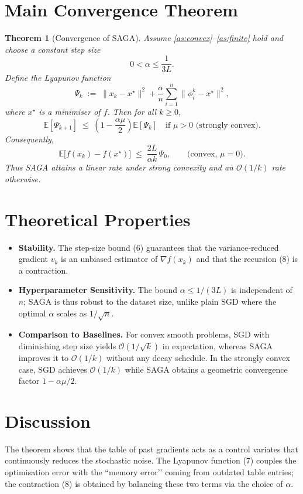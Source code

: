 \documentclass{article}
\newtheorem{theorem}{Theorem}
\begin{document}
\section*{Main Convergence Theorem}
\begin{theorem}[Convergence of SAGA]\label{thm:conv}
Assume \ref{as:convex}–\ref{as:finite} hold and choose a constant step size
\[
0<\alpha\le\frac{1}{3L}.
\tag{6}
\]
Define the Lyapunov function
\[
\Psi_k\;:=\;\|x_k-x^\star\|^2
          +\frac{\alpha}{n}\sum_{i=1}^{n}\|\phi_i^{k}-x^\star\|^2,
\tag{7}
\]
where $x^\star$ is a minimiser of $f$. Then for all $k\ge0$,
\[
\mathbb{E}[\Psi_{k+1}]\;\le\;
\left(1-\frac{\alpha\mu}{2}\right)\mathbb{E}[\Psi_k]
\quad\text{if $\mu>0$ (strongly convex).}
\tag{8}
\]
Consequently,
\[
\mathbb{E}\bigl[f(x_k)-f(x^\star)\bigr]\;\le\;
\frac{2L}{\alpha k}\,\Psi_0,
\qquad\text{(convex, $\mu=0$)}.
\tag{9}
\]
Thus SAGA attains a linear rate under strong convexity and an
$\mathcal{O}(1/k)$ rate otherwise.
\end{theorem}

\section*{Theoretical Properties}
\begin{itemize}
\item \textbf{Stability.} The step‑size bound (6) guarantees that the
variance‑reduced gradient $v_k$ is an unbiased estimator of $\nabla f(x_k)$
and that the recursion (8) is a contraction.
\item \textbf{Hyperparameter Sensitivity.}
The bound $\alpha\le 1/(3L)$ is independent of $n$; SAGA is thus
robust to the dataset size, unlike plain SGD where the optimal $\alpha$
scales as $1/\sqrt{n}$.
\item \textbf{Comparison to Baselines.}
For convex smooth problems, SGD with diminishing step size yields
$\mathcal{O}(1/\sqrt{k})$ in expectation, whereas SAGA improves it to
$\mathcal{O}(1/k)$ without any decay schedule. In the strongly convex
case, SGD achieves $\mathcal{O}(1/k)$ while SAGA obtains a geometric
convergence factor $1-\alpha\mu/2$.
\end{itemize}

\section*{Discussion}
The theorem shows that the table of past gradients acts as a control
variates that continuously reduces the stochastic noise. The Lyapunov
function (7) couples the optimisation error with the “memory error’’
coming from outdated table entries; the contraction (8) is obtained by
balancing these two terms via the choice of $\alpha$.
\end{document}
